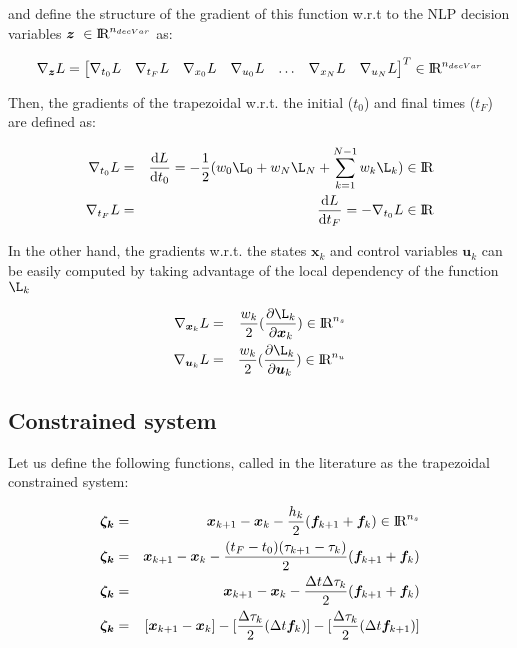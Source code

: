 \documentclass[12pt]{article}
\newcommand{\real}{\mbox{\rm I$\!$R}}
\begin{document}
\noindent and define the structure of the gradient of this function w.r.t to the NLP decision variables $\bm{z}\ \in \real^{n_{decVar}}$ as:

\begin{equation} \nonumber
    \nabla_{\bm{z}} L =\begin{bmatrix}
\nabla_{t_{0}} L & \nabla_{t_{F}}L & \nabla_{x_{0}} L & \nabla_{u_{0}} L & \hdots & \nabla_{x_{N}} L & \nabla_{u_{N}} L
\end{bmatrix}^T \in \real^{n_{decVar}}
\end{equation}

\newpage

\noindent Then, the gradients of the trapezoidal w.r.t. the initial ($t_0$) and final times ($t_F$) are defined as:

\begin{eqnarray}
   \nabla_{t_{0}}L&=&\frac{\mathrm{d} L}{\mathrm{d} t_0} = -\frac{1}{2}(w_0\L_0+w_{N}\L_{N}+\sum_{k=1}^{N-1} w_k\L_k) \in  \real\\
   \nabla_{t_{F}}L&=&\frac{\mathrm{d} L}{\mathrm{d} t_F} = - \nabla_{t_{0}} L \in \real
   \end{eqnarray}
   
\noindent In the other hand, the gradients w.r.t. the states $\bm{x}_k$ and control variables $\bm{u}_k$ can be easily computed by taking advantage of the local dependency of the function $\L_k$

\begin{eqnarray}
   \nabla_{\bm{x}_k}L&=&\frac{w_k}{2}(\frac{\partial \L_k}{\partial \bm{x}_k}) \in  \real ^{n_s}\\
   \nabla_{\bm{u}_k}L&=&\frac{w_k}{2}(\frac{\partial \L_k}{\partial \bm{u}_k}) \in  \real ^{n_u}
\end{eqnarray}


\subsection{Constrained system}
Let us define the following functions, called in the literature as the trapezoidal constrained system:

\begin{eqnarray}
    \bm{\zeta_k} &=&\bm{x}_{k+1}-\bm{x}_{k}- \frac{h_k}{2}(\bm{f}_{k+1}+\bm{f}_{k}) \in \real^{n_s} \\
    \bm{\zeta_k} &=&\bm{x}_{k+1}-\bm{x}_{k}- \frac{(t_F-t_0) (\tau_{k+1}-\tau_k)}{2}(\bm{f}_{k+1}+\bm{f}_{k})\\
    \bm{\zeta_k} &=&\bm{x}_{k+1}-\bm{x}_{k}- \frac{\Delta t \Delta \tau_k}{2}(\bm{f}_{k+1}+\bm{f}_{k})\\
    \bm{\zeta_k} &=&[\bm{x}_{k+1}-\bm{x}_{k}]- [\frac{\Delta\tau_k}{2}(\Delta t\bm{f}_{k})]- [\frac{\Delta\tau_k}{2}(\Delta t\bm{f}_{k+1})] \label{eq:trapSeparability}
\end{eqnarray}
\end{document}
